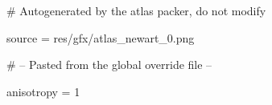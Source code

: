 # Autogenerated by the atlas packer, do not modify

source = res/gfx/atlas_newart_0.png

# -- Pasted from the global override file --

anisotropy = 1
